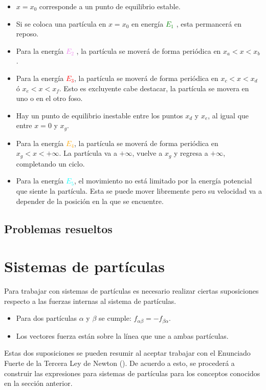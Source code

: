 \documentclass[/home/hernan/Documentos/Apuntes_mecanica_teorica/main.tex]{subfiles}
\begin{document}
	\begin{itemize}
		\item $x = x_{0}$ corresponde a un punto de equilibrio estable.
		\item Si se coloca una partícula en $x = x_{0}$ en energía \textcolor{green}{$E_{1}$} , esta permancerá en reposo.
		\item Para la energía \textcolor{violet}{$E_{2}$} , la partícula se moverá de forma periódica en $x_{a} < x < x_{b}$.
		\item Para la energía \textcolor{red}{$E_{3}$}, la partícula se moverá de forma periódica en $x_{c} < x < x_{d}$ ó $x_{e} < x < x_{f}$. Esto es excluyente cabe destacar, la partícula se movera en uno o en el otro foso.
		\item Hay un punto de equilibrio inestable entre los puntos $x_{d}$ y $x_{e}$, al igual que entre $x = 0$ y $x_{g}$.
		\item Para la energía \textcolor{orange}{$E_{4}$}, la partícula se moverá de forma periódica en $x_{g} < x < +\infty $. La partícula va a $+\infty$, vuelve a $x_{g}$ y regresa a $+\infty$, completando un ciclo.
		\item Para la energía \textcolor{cyan}{$E_{5}$}, el movimiento no está limitado por la energía potencial que siente la partícula. Esta se puede mover libremente pero su velocidad va a depender de la posición en la que se encuentre.
	\end{itemize}


	\subsection{Problemas resueltos}

	
	

	\section{Sistemas de partículas}
	\label{sec: sisparticulas}

	Para trabajar con sistemas de partículas es necesario realizar ciertas suposiciones respecto a las fuerzas internas al sistema de partículas.

	\begin{itemize}
		\item Para dos partículas $\alpha$ y $\beta$ se cumple: $f_{\alpha \beta} = - f_{\beta \alpha}$.
		\item Los vectores fuerza están sobre la línea que une a ambas partículas.
	\end{itemize}
	Estas dos suposiciones se pueden resumir al aceptar trabajar con el Enunciado Fuerte de la Tercera Ley de Newton (). De acuerdo a esto, se procederá a construir las expresiones para sistemas de partículas para los conceptos conocidos en la sección anterior.
\end{document}
